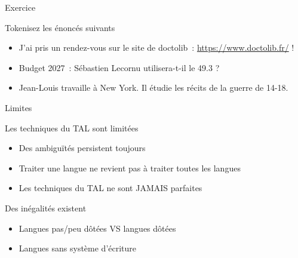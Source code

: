 \documentclass[serif, aspectratio=169]{beamer}
\begin{document}
\begin{exoframe}{Exercice}
    \begin{block}{Tokenisez les énoncés suivants}
        \begin{itemize} \color{white}
            \item J'ai pris un rendez-vous sur le site de doctolib~: \url{https://www.doctolib.fr/} !
            \item Budget 2027~: Sébastien Lecornu utilisera-t-il le 49.3 ?
            \item Jean-Louis travaille à New York. Il étudie les récits de la guerre de 14-18.
        \end{itemize}
    \end{block}
\end{exoframe}

\begin{frame}{Limites}
    \begin{block}{Les techniques du TAL sont limitées}
        \begin{itemize}
            \item Des ambiguïtés persistent toujours
            \item Traiter une langue ne revient pas à traiter toutes les langues
            \item Les techniques du TAL ne sont JAMAIS parfaites
        \end{itemize}
    \end{block}
    \begin{block}{Des inégalités existent}
        \begin{itemize}
            \item Langues pas/peu dôtées VS langues dôtées
            \item Langues sans système d'écriture
        \end{itemize}
    \end{block}
\end{frame}
\end{document}
